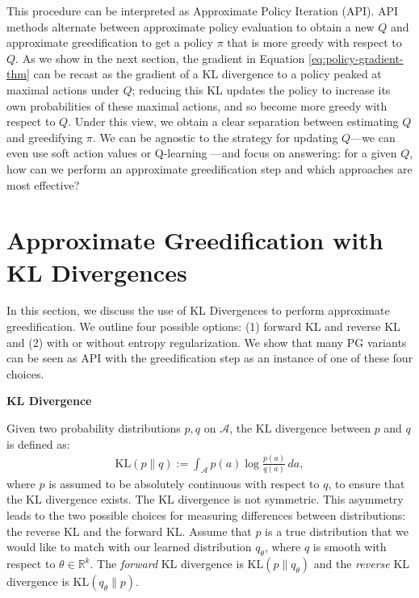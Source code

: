 \documentclass[twoside,11pt]{article}
\newcommand{\R}{\mathbb{R}}
\newcommand{\actionspace}{\mathcal{A}}
\newcommand{\Qhat}{{Q}}
\newcommand{\KL}{\mathrm{KL}}
\newcommand{\defeq}{:=}
\begin{document}
This procedure can be interpreted as Approximate Policy Iteration (API). API methods alternate between approximate policy evaluation to obtain a new $\Qhat$ and approximate greedification to get a policy $\pi$ that is more greedy with respect to $\Qhat$. As we show in the next section, the gradient in Equation \eqref{eq:policy-gradient-thm} can be recast as the gradient of a KL divergence to a policy peaked at maximal actions under $\Qhat$; reducing this KL updates the policy to increase its own probabilities of these maximal actions, and so become more greedy with respect to $\Qhat$. Under this view, we obtain a clear separation between estimating $\Qhat$ and greedifying $\pi$. We can be agnostic to the strategy for updating $\Qhat$---we can even use soft action values \citep{ziebart2010modeling} or Q-learning \citep{watkins1992q}---and focus on answering: for a given $\Qhat$, how can we perform an approximate greedification step and which approaches are most effective? 
   
\section{Approximate Greedification with KL Divergences}\label{sec:sac}

In this section, we discuss the use of KL Divergences to perform approximate greedification. We outline four possible options: (1) forward KL and reverse KL and (2) with or without entropy regularization. We show that many PG variants can be seen as API with the greedification step as an instance of one of these four choices. %

\textbf{KL Divergence}

Given two probability distributions $p, q$ on $\actionspace$, the KL divergence between $p$ and $q$ is defined as:
\begin{align}
\KL(p \parallel q) \defeq \int_\actionspace p(a) \log\frac{p(a)}{q(a)}\, da,
\end{align}
%
where $p$ is assumed to be {absolutely continuous} \citep{billingsley2008probability} with respect to $q$, to ensure that the KL divergence exists. 
%
The KL divergence is not symmetric. This asymmetry leads to the two possible choices for measuring differences between distributions: the reverse KL and the forward KL. Assume that $p$ is a true distribution that we would like to match with our learned distribution $q_\theta$, where  $q$ is smooth with respect to $\theta \in \R^k$. The \textit{forward} KL divergence is $\KL(p \parallel q_\theta)$ and the \textit{reverse} KL divergence is $\KL(q_\theta \parallel p)$. 
\end{document}

